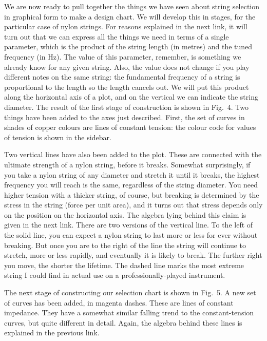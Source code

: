   We are now ready to pull together the things we have seen about string 
  selection in graphical form to make a design chart. We will develop this in 
  stages, for the particular case of nylon strings. For reasons explained in 
  the next link, it will turn out that we can express all the things we need in 
  terms of a single parameter, which is the product of the string length (in 
  metres) and the tuned frequency (in Hz). The value of this parameter, 
  remember, is something we already know for any given string. Also, the value 
  does not change if you play different notes on the same string: the 
  fundamental frequency of a string is proportional to the length so the length 
  cancels out. We will put this product along the horizontal axis of a plot, 
  and on the vertical we can indicate the string diameter. The result of the 
  first stage of construction is shown in Fig.\ 4. Two things have been added 
  to the axes just described. First, the set of curves in shades of copper 
  colours are lines of constant tension: the colour code for values of tension 
  is shown in the sidebar. 

  Two vertical lines have also been added to the plot. These are connected with 
  the ultimate strength of a nylon string, before it breaks. Somewhat 
  surprisingly, if you take a nylon string of any diameter and stretch it until 
  it breaks, the highest frequency you will reach is the same, regardless of 
  the string diameter. You need higher tension with a thicker string, of 
  course, but breaking is determined by the stress in the string (force per 
  unit area), and it turns out that stress depends only on the position on the 
  horizontal axis. The algebra lying behind this claim is given in the next 
  link. There are two versions of the vertical line. To the left of the solid 
  line, you can expect a nylon string to last more or less for ever without 
  breaking. But once you are to the right of the line the string will continue 
  to stretch, more or less rapidly, and eventually it is likely to break. The 
  further right you move, the shorter the lifetime. The dashed line marks the 
  most extreme string I could find in actual use on a professionally-played 
  instrument. 

  The next stage of constructing our selection chart is shown in Fig.\ 5. A new 
  set of curves has been added, in magenta dashes. These are lines of constant 
  impedance. They have a somewhat similar falling trend to the constant-tension 
  curves, but quite different in detail. Again, the algebra behind these lines 
  is explained in the previous link. 

